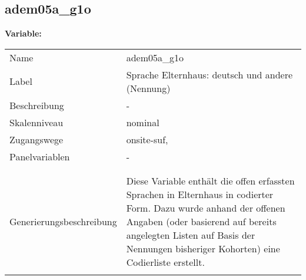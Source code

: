 	
	
	\subsection{adem05a\_g1o}
	\label{subSection:adem05a_g1o}

	\noindent\textbf{Variable:}\\
		\begin{tabular}{lL{11.3cm}}
			\label{tableVariable:adem05a_g1o}
			Name & adem05a\_g1o \\
			Label & Sprache Elternhaus: deutsch und andere (Nennung) \\
			Beschreibung & - \\
			Skalenniveau & nominal \\
			Zugangswege &
				onsite-suf,
 \\
			Panelvariablen & -
			 \\
			 \\
 \\
					Generierungsbeschreibung & Diese Variable enthält die offen erfassten Sprachen in Elternhaus in codierter Form. Dazu wurde anhand der offenen Angaben (oder basierend auf bereits angelegten Listen auf Basis der Nennungen bisheriger Kohorten) eine Codierliste erstellt.
				 \\	
			 \\
		\end{tabular}






